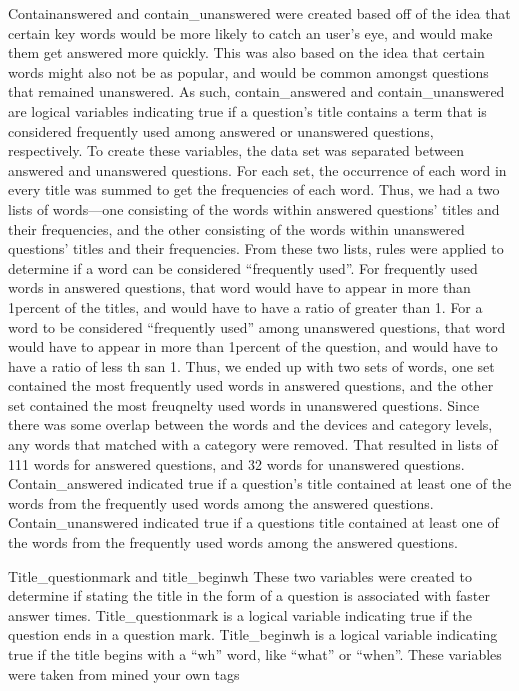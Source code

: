 \documentclass[12pt]{article}
\begin{document}
Containanswered and contain_unanswered were created based off of the idea that certain key words would be more likely to catch an user’s eye, and would make them get answered more quickly. This was also based on the idea that certain words might also not be as popular, and would be common amongst questions that remained unanswered. As such, contain_answered and contain_unanswered are logical variables indicating true if a question’s title contains a term that is considered frequently used among answered or unanswered questions, respectively. To create these variables, the data set was separated between answered and unanswered questions. For each set, the occurrence of each word in every title was summed to get the frequencies of each word. Thus, we had a two lists of words—one consisting of the words within answered questions’ titles and their frequencies, and the other consisting of the words within unanswered questions’ titles and their frequencies. From these two lists, rules were applied to determine if a word can be considered “frequently used”.  For frequently used words in answered questions, that word would have to appear in more than 1percent of the titles, and would have to have a ratio of greater than 1. For a word to be considered “frequently used” among unanswered questions, that word would have to appear in more than 1percent of the question, and would have to have a ratio of less th san 1. Thus, we ended up with two sets of words, one set contained the most frequently used words in answered questions, and the other set contained the most freuqnelty used words in unanswered questions. Since there was some overlap between the words and the devices and category levels, any words that matched with a category were removed. That resulted in lists of 111 words for answered questions, and 32 words for unanswered questions. Contain_answered indicated true if a question’s title contained at least one of the words from the frequently used words among the answered questions. Contain_unanswered indicated true if a questions title contained at least one of the words from the frequently used words among the answered questions. 

Title_questionmark and title_beginwh 
These two variables were created to determine if stating the title in the form of a question is associated with faster answer times. Title_questionmark is a logical variable indicating true if the question ends in a question mark. Title_beginwh is a logical variable indicating true if the title begins with a “wh” word, like “what” or “when”. These variables were taken from mined your own tags
\end{document}
